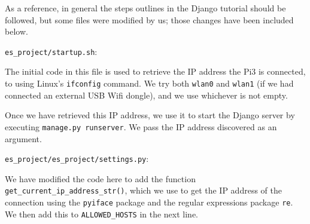 
	
	As a reference, in general the steps outlines in the Django tutorial \cite{DjangoTutorial} should be followed, but some files were modified by us; those changes have been included below.
	
	\begin{description}[font=\quad $\circ$, topsep=-2pt, itemsep=2pt]
		\item \texttt{es\_project/startup.sh}:
		
			
			
			The initial code in this file is used to retrieve the IP address the Pi3 is connected, to using Linux's \texttt{ifconfig} command. We try both \texttt{wlan0} and \texttt{wlan1} (if we had connected an external USB Wifi dongle), and we use whichever is not empty. 
			
			Once we have retrieved this IP address, we use it to start the Django server by executing \texttt{manage.py runserver}. We pass the IP address discovered as an argument.
		
		
		
		\item \texttt{es\_project/es\_project/settings.py}:
		
			
			
			We have modified the code here to add the function \texttt{get\_current\_ip\_address\_str()}, which we use to get the IP address of the connection using the \texttt{pyiface} package and the regular expressions package \texttt{re}. We then add this to \texttt{ALLOWED\_HOSTS} in the next line.
		
		
	\end{description}
